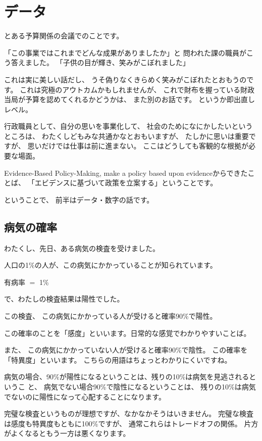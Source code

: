 \documentclass[uplatex,jis2004,dvipdfmx,12pt]{jsarticle}
\begin{document}
\section{データ}
とある予算関係の会議でのことです。

「この事業ではこれまでどんな成果がありましたか」と
問われた課の職員がこう答えました。
「子供の目が輝き、笑みがこぼれました」

これは実に美しい話だし、
うそ偽りなくきらめく笑みがこぼれたとおもうのです。
これは究極のアウトカムかもしれませんが、
これで財布を握っている財政当局が予算を認めてくれるかどうかは、
また別のお話です。
というか即出直しレベル。




行政職員として、自分の思いを事業化して、
社会のためになにかしたいというところは、
わたくしどもみな共通かなとおもいますが、
たしかに思いは重要ですが、
思いだけでは仕事は前に進まない。
ここはどうしても客観的な根拠が必要な場面。


Evidence-Based Policy-Making,
make a policy based upon evidenceからできたことば、
「エビデンスに基づいて政策を立案する」ということです。

ということで、
前半はデータ・数字の話です。


\subsection{病気の確率}

わたくし、先日、ある病気の検査を受けました。

人口の1\%の人が、この病気にかかっていることが知られています。

有病率 $=$ 1\%

で、わたしの検査結果は陽性でした。

この検査、
この病気にかかっている人が受けると確率90\%で陽性。

この確率のことを「感度」といいます。日常的な感覚でわかりやすいことば。

また、
この病気にかかっていない人が受けると確率90\%で陰性。
この確率を「特異度」といいます。
こちらの用語はちょっとわかりにくいですね。

病気の場合、90\%が陽性になるということは、残りの10\%は病気を見逃されるというこ
と、
病気でない場合90\%で陰性になるということは、
残りの10\%は病気でないのに陽性になって心配することになります。

完璧な検査というものが理想ですが、なかなかそうはいきません。
完璧な検査は感度も特異度もともに100\%ですが、
通常これらはトレードオフの関係。
片方がよくなるともう一方は悪くなります。
\end{document}
